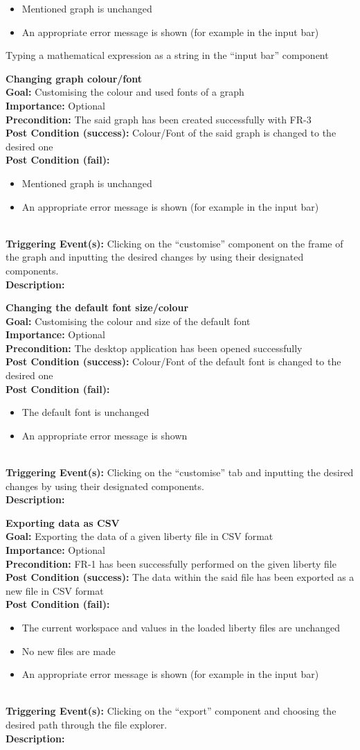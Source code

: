\documentclass[10pt,a4paper]{report}
\newcommand{\FRODescription}[8]{
    \textbf{#1} \leavevmode \\
    \textbf{Goal: } #2 \leavevmode \\
    \textbf{Importance: } #3 \leavevmode \\
    \textbf{Precondition: } #4 \leavevmode \\
    \textbf{Post Condition (success): } #5 \leavevmode \\
    \textbf{Post Condition (fail): } #6 \leavevmode \\
    \textbf{Triggering Event(s): } #7 \leavevmode \\
    \textbf{Description: } \leavevmode \\
    #8}
\begin{document}
\begin{FRO}
{\begin{itemize}
        \item Mentioned graph is unchanged
        \item An appropriate error message is shown (for example in the input bar)
    \end{itemize}}
    {Typing a mathematical expression as a string in the “input bar” component}
    \item \FRODescription{Changing graph colour/font}
    {Customising the colour and used fonts of a graph}
    {Optional}
    {The said graph has been created successfully with FR-3}
    {Colour/Font of the said graph is changed to the desired one}
    {\begin{itemize}
        \item Mentioned graph is unchanged
        \item An appropriate error message is shown (for example in the input bar)
    \end{itemize}}
    {Clicking on the “customise” component on the frame of the graph and inputting the desired changes by using their designated components.}
    \item \FRODescription{Changing the default font size/colour}
    {Customising the colour and size of the default font}
    {Optional}
    {The desktop application has been opened successfully}
    {Colour/Font of the default font is changed to the desired one}
    {\begin{itemize}
        \item The default font is unchanged
        \item An appropriate error message is shown
    \end{itemize}}
    {Clicking on the “customise” tab and inputting the desired changes by using their designated components.}
    \item \FRODescription{Exporting data as CSV}
    {Exporting the data of a given liberty file in CSV format}
    {Optional}
    {FR-1 has been successfully performed on the given liberty file}
    {The data within the said file has been exported as a new file in CSV format}
    {\begin{itemize}
        \item The current workspace and values in the loaded liberty files are unchanged
        \item No new files are made
        \item An appropriate error message is shown (for example in the input bar)
    \end{itemize}}
    {Clicking on the “export” component and choosing the desired path through the file explorer.}

\end{FRO}
\end{document}

